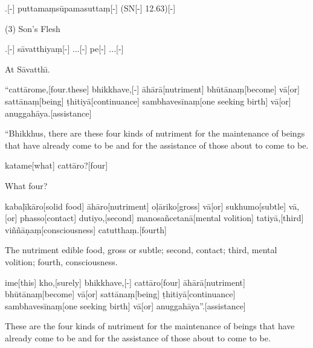 
\begin{samepage}
.[-] puttamaṃsūpamasuttaṃ[-] (SN[-] 12.63)[-]
\endgl
\nopagebreak
\linespread{0.5}
\begin{spacin}{0.2}
{ (3) Son’s Flesh}
\end{spacin}
\vskip 12pt
\end{samepage}
\vskip 0.2in
\begin{samepage}
.[-] sāvatthiyaṃ[-] ...[-] pe[-] ...[-]
\endgl
\nopagebreak
\linespread{0.5}
\begin{spacin}{0.2}
{\PaliGlossFT At Sāvatthı̄.}
\end{spacin}
\vskip 12pt
\end{samepage}
\begin{samepage}
\begingl[glneveryline={\PaliGlossA,\PaliGlossB}]
“cattārome,[four.these] bhikkhave,[-] āhārā[nutriment] bhūtānaṃ[become] vā[or] sattānaṃ[being] ṭhitiyā[continuance] sambhavesīnaṃ[one seeking birth] vā[or] anuggahāya.[assistance]
\endgl
\nopagebreak
\linespread{0.5}
\begin{spacin}{0.2}
{\PaliGlossFT “Bhikkhus, there are these four kinds of nutriment for the maintenance of beings that have already come to be and for the assistance of those about to come to be.}
\end{spacin}
\vskip 12pt
\end{samepage}
\begin{samepage}
\begingl[glneveryline={\PaliGlossA,\PaliGlossB}]
katame[what] cattāro?[four]
\endgl
\nopagebreak
\linespread{0.5}
\begin{spacin}{0.2}
{\PaliGlossFT What four?}
\end{spacin}
\vskip 12pt
\end{samepage}
\begin{samepage}
\begingl[glneveryline={\PaliGlossA,\PaliGlossB}]
kabaḷīkāro[solid food] āhāro[nutriment] oḷāriko[gross] vā[or] sukhumo[subtle] vā,[or] phasso[contact] dutiyo,[second] manosañcetanā[mental volition] tatiyā,[third] viññāṇaṃ[consciousness] catutthaṃ.[fourth]
\endgl
\nopagebreak
\linespread{0.5}
\begin{spacin}{0.2}
{\PaliGlossFT The nutriment edible food, gross or subtle; second, contact; third, mental volition; fourth, consciousness.}
\end{spacin}
\vskip 12pt
\end{samepage}
\begin{samepage}
\begingl[glneveryline={\PaliGlossA,\PaliGlossB}]
ime[this] kho,[surely] bhikkhave,[-] cattāro[four] āhārā[nutriment] bhūtānaṃ[become] vā[or] sattānaṃ[being] ṭhitiyā[continuance] sambhavesīnaṃ[one seeking birth] vā[or] anuggahāya”.[assistance]
\endgl
\nopagebreak
\linespread{0.5}
\begin{spacin}{0.2}
{\PaliGlossFT These are the four kinds of nutriment for the maintenance of beings that have already come to be and for the assistance of those about to come to be.}
\end{spacin}
\vskip 12pt
\end{samepage}
